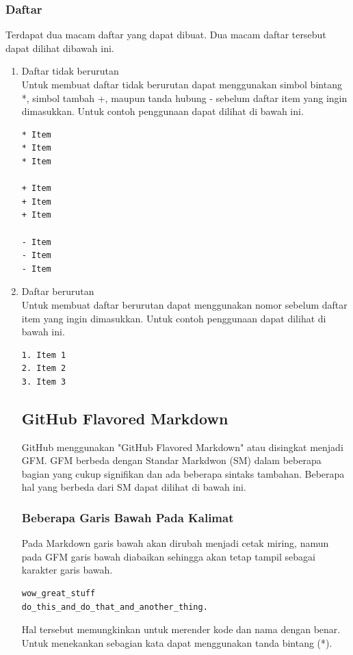 \subsubsection{Daftar}
Terdapat dua macam daftar yang dapat dibuat. Dua macam daftar tersebut dapat dilihat dibawah ini.

\begin{enumerate}
\item Daftar tidak berurutan\\
Untuk membuat daftar tidak berurutan dapat menggunakan simbol bintang *, simbol tambah +, maupun tanda hubung - sebelum daftar item yang ingin dimasukkan. Untuk contoh penggunaan dapat dilihat di bawah ini.
\begin{lstlisting}
* Item
* Item
* Item

+ Item
+ Item
+ Item

- Item
- Item
- Item
\end{lstlisting}
\item Daftar berurutan\\
Untuk membuat daftar berurutan dapat menggunakan nomor sebelum daftar item yang ingin dimasukkan. Untuk contoh penggunaan dapat dilihat di bawah ini.
\begin{lstlisting}
1. Item 1
2. Item 2
3. Item 3
\end{lstlisting}

\subsection{GitHub Flavored Markdown \cite{Markdown:2015}}
GitHub menggunakan "GitHub Flavored Markdown" atau disingkat menjadi GFM. GFM berbeda dengan Standar Markdwon (SM) dalam beberapa bagian yang cukup signifikan dan ada beberapa sintaks tambahan. Beberapa hal yang berbeda dari SM dapat dilihat di bawah ini.

\subsubsection{Beberapa Garis Bawah Pada Kalimat}
Pada Markdown garis bawah akan dirubah menjadi cetak miring, namun pada GFM garis bawah diabaikan sehingga akan tetap tampil sebagai karakter garis bawah.
\begin{lstlisting}
wow_great_stuff
do_this_and_do_that_and_another_thing.
\end{lstlisting}
Hal tersebut memungkinkan untuk merender kode dan nama dengan benar. Untuk menekankan sebagian kata dapat menggunakan tanda bintang (*).


\end{enumerate}
